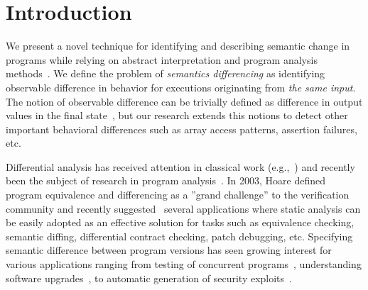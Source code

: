 \section{Introduction} 

We present a novel technique for identifying and describing semantic change in programs while relying on abstract interpretation and program analysis methods~\cite{CousotCousot77}. We define the problem of \emph{semantics differencing} as identifying observable difference in behavior for executions originating from \emph{the same input}. The notion of observable difference can be trivially defined as difference in output values in the final state~\cite{DwyerElbaumPerson08,GodlinStrichman09,EnglerRamos11,HawblitzelKawaguchiLahiriRebelo12}, but our research extends this notions to detect other important behavioral differences such as array access patterns, assertion failures, etc.


Differential analysis has received attention in classical work (e.g.,~\cite{Horwitz90,Horwitz89,JacksonLadd94}) and recently been the subject of research in program analysis~\cite{DwyerElbaumPerson08,GodlinStrichman09,EnglerRamos11,HawblitzelKawaguchiLahiriRebelo12}. In 2003, Hoare defined program equivalence and differencing as a ''grand challenge'' to the verification community and recently suggested~\cite{HoareLahiriVaswani10} several applications where static analysis can be easily adopted as an effective solution for tasks such as equivalence checking, semantic diffing, differential contract checking, patch debugging, etc. Specifying semantic difference between program versions has seen growing interest for various applications ranging from testing of concurrent programs~\cite{ChakiGurfinkelStrichman12}, understanding software upgrades~\cite{JinOrsoXie10}, to automatic generation of security exploits~\cite{BrumleyPoosankamSongZheng08}.

